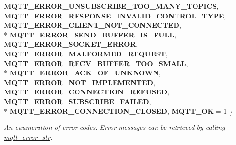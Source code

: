 \begin{DoxyCompactItemize}
{\bfseries M\+Q\+T\+T\+\_\+\+E\+R\+R\+O\+R\+\_\+\+U\+N\+S\+U\+B\+S\+C\+R\+I\+B\+E\+\_\+\+T\+O\+O\+\_\+\+M\+A\+N\+Y\+\_\+\+T\+O\+P\+I\+CS}, 
{\bfseries M\+Q\+T\+T\+\_\+\+E\+R\+R\+O\+R\+\_\+\+R\+E\+S\+P\+O\+N\+S\+E\+\_\+\+I\+N\+V\+A\+L\+I\+D\+\_\+\+C\+O\+N\+T\+R\+O\+L\+\_\+\+T\+Y\+PE}, 
{\bfseries M\+Q\+T\+T\+\_\+\+E\+R\+R\+O\+R\+\_\+\+C\+L\+I\+E\+N\+T\+\_\+\+N\+O\+T\+\_\+\+C\+O\+N\+N\+E\+C\+T\+ED}, 
\\*
{\bfseries M\+Q\+T\+T\+\_\+\+E\+R\+R\+O\+R\+\_\+\+S\+E\+N\+D\+\_\+\+B\+U\+F\+F\+E\+R\+\_\+\+I\+S\+\_\+\+F\+U\+LL}, 
{\bfseries M\+Q\+T\+T\+\_\+\+E\+R\+R\+O\+R\+\_\+\+S\+O\+C\+K\+E\+T\+\_\+\+E\+R\+R\+OR}, 
{\bfseries M\+Q\+T\+T\+\_\+\+E\+R\+R\+O\+R\+\_\+\+M\+A\+L\+F\+O\+R\+M\+E\+D\+\_\+\+R\+E\+Q\+U\+E\+ST}, 
{\bfseries M\+Q\+T\+T\+\_\+\+E\+R\+R\+O\+R\+\_\+\+R\+E\+C\+V\+\_\+\+B\+U\+F\+F\+E\+R\+\_\+\+T\+O\+O\+\_\+\+S\+M\+A\+LL}, 
\\*
{\bfseries M\+Q\+T\+T\+\_\+\+E\+R\+R\+O\+R\+\_\+\+A\+C\+K\+\_\+\+O\+F\+\_\+\+U\+N\+K\+N\+O\+WN}, 
{\bfseries M\+Q\+T\+T\+\_\+\+E\+R\+R\+O\+R\+\_\+\+N\+O\+T\+\_\+\+I\+M\+P\+L\+E\+M\+E\+N\+T\+ED}, 
{\bfseries M\+Q\+T\+T\+\_\+\+E\+R\+R\+O\+R\+\_\+\+C\+O\+N\+N\+E\+C\+T\+I\+O\+N\+\_\+\+R\+E\+F\+U\+S\+ED}, 
{\bfseries M\+Q\+T\+T\+\_\+\+E\+R\+R\+O\+R\+\_\+\+S\+U\+B\+S\+C\+R\+I\+B\+E\+\_\+\+F\+A\+I\+L\+ED}, 
\\*
{\bfseries M\+Q\+T\+T\+\_\+\+E\+R\+R\+O\+R\+\_\+\+C\+O\+N\+N\+E\+C\+T\+I\+O\+N\+\_\+\+C\+L\+O\+S\+ED}, 
{\bfseries M\+Q\+T\+T\+\_\+\+OK} = 1
 \}\begin{DoxyCompactList}\small\item\em An enumeration of error codes. Error messages can be retrieved by calling \hyperlink{group__api_ga47b62bdd24e8b05957825d2419d7c848}{mqtt\+\_\+error\+\_\+str}. \end{DoxyCompactList}
\end{DoxyCompactItemize}
